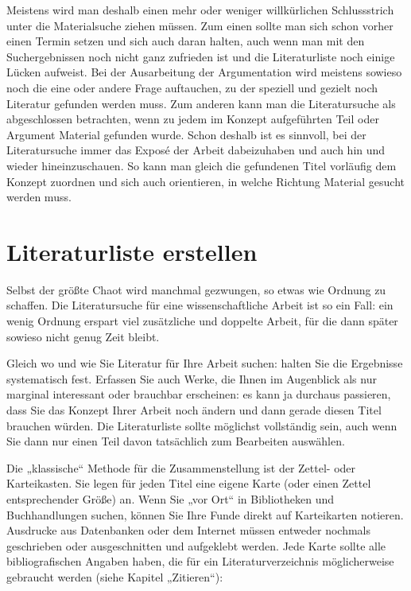 \documentclass[]{book}
\theoremstyle{definition}
\theoremstyle{definition}
\theoremstyle{definition}
\theoremstyle{remark}
\begin{document}
Meistens wird man deshalb einen mehr oder weniger willkürlichen
Schlussstrich unter die Materialsuche ziehen müssen. Zum einen sollte
man sich schon vorher einen Termin setzen und sich auch daran halten,
auch wenn man mit den Suchergebnissen noch nicht ganz zufrieden ist und
die Literaturliste noch einige Lücken aufweist. Bei der Ausarbeitung der
Argumentation wird meistens sowieso noch die eine oder andere Frage
auftauchen, zu der speziell und gezielt noch Literatur gefunden werden
muss. Zum anderen kann man die Literatursuche als abgeschlossen
betrachten, wenn zu jedem im Konzept aufgeführten Teil oder Argument
Material gefunden wurde. Schon deshalb ist es sinnvoll, bei der
Literatursuche immer das Exposé der Arbeit dabeizuhaben und auch hin und
wieder hineinzuschauen. So kann man gleich die gefundenen Titel
vorläufig dem Konzept zuordnen und sich auch orientieren, in welche
Richtung Material gesucht werden muss.

\section{Literaturliste erstellen}\label{literaturliste-erstellen}

Selbst der größte Chaot wird manchmal gezwungen, so etwas wie Ordnung zu
schaffen. Die Literatursuche für eine wissenschaftliche Arbeit ist so
ein Fall: ein wenig Ordnung erspart viel zusätzliche und doppelte
Arbeit, für die dann später sowieso nicht genug Zeit bleibt.

Gleich wo und wie Sie Literatur für Ihre Arbeit suchen: halten Sie die
Ergebnisse systematisch fest. Erfassen Sie auch Werke, die Ihnen im
Augenblick als nur marginal interessant oder brauchbar erscheinen: es
kann ja durchaus passieren, dass Sie das Konzept Ihrer Arbeit noch
ändern und dann gerade diesen Titel brauchen würden. Die Literaturliste
sollte möglichst vollständig sein, auch wenn Sie dann nur einen Teil
davon tatsächlich zum Bearbeiten auswählen.

Die „klassische`` Methode für die Zusammenstellung ist der Zettel- oder
Karteikasten. Sie legen für jeden Titel eine eigene Karte (oder einen
Zettel entsprechender Größe) an. Wenn Sie „vor Ort`` in Bibliotheken und
Buchhandlungen suchen, können Sie Ihre Funde direkt auf Karteikarten
notieren. Ausdrucke aus Datenbanken oder dem Internet müssen entweder
nochmals geschrieben oder ausgeschnitten und aufgeklebt werden. Jede
Karte sollte alle bibliografischen Angaben haben, die für ein
Literaturverzeichnis möglicherweise gebraucht werden (siehe Kapitel
„Zitieren``):
\end{document}
